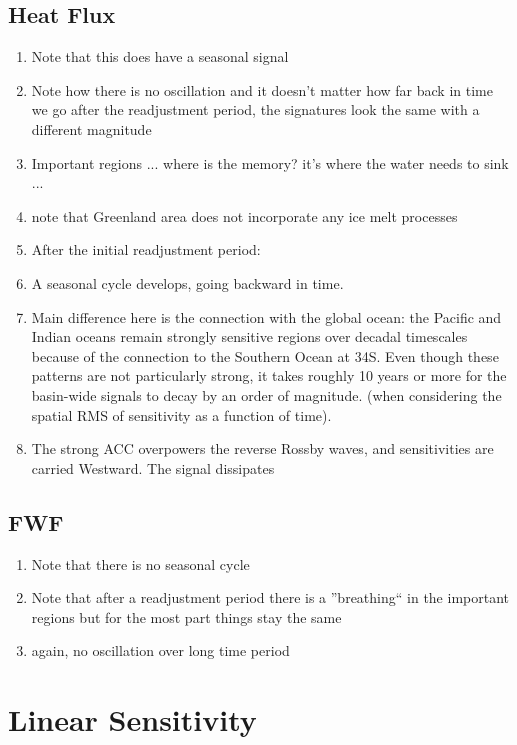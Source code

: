 \documentclass[a4paper,11pt]{article}
\begin{document}
   \subsection{Heat Flux} 
    \begin{enumerate} 
	\item Note that this does have a seasonal signal 
	\item Note how there is no oscillation and it doesn't matter how far back in time we go after the readjustment period, the signatures look the same with a different magnitude
	\item Important regions ... where is the memory? it's where the water needs to sink ... 
	\item note that Greenland area does not incorporate any ice melt processes 
	\item After the initial readjustment period:
	\item A seasonal cycle develops, going backward in time. 
	\item Main difference here is the connection with the global ocean: the Pacific and Indian oceans remain strongly sensitive regions over decadal timescales because of the connection to the Southern Ocean at 34S. Even though these patterns are not particularly strong, it takes roughly 10 years or more for the basin-wide signals to decay by an order of magnitude. (when considering the spatial RMS of sensitivity as a function of time).  
	\item The strong ACC overpowers the reverse Rossby waves, and sensitivities are carried Westward. The signal dissipates 
    \end{enumerate} 
   \subsection{FWF}
    \begin{enumerate}
	\item Note that there is no seasonal cycle
	\item Note that after a readjustment period there is a ''breathing`` in the important regions but for the most part things stay the same 
	\item again, no oscillation over long time period
    \end{enumerate} 


  \section{Linear Sensitivity}
  \label{linearSensitivity}
  
\end{document}
